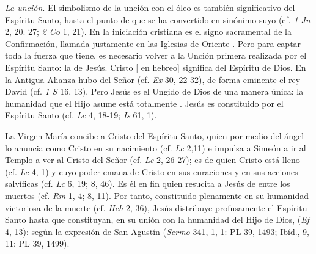 	
	 \emph{La unción}. El simbolismo de la unción con el óleo es también significativo del Espíritu Santo, hasta el punto de que se ha convertido en sinónimo suyo (cf. \emph{1 Jn} 2, 20. 27; \emph{2 Co} 1, 21). En la iniciación cristiana es el signo sacramental de la Confirmación, llamada justamente en las Iglesias de Oriente . Pero para captar toda la fuerza que tiene, es necesario volver a la Unción primera realizada por el Espíritu Santo: la de Jesús. Cristo {[} en hebreo{]} significa  del Espíritu de Dios. En la Antigua Alianza hubo  del Señor (cf. \emph{Ex} 30, 22-32), de forma eminente el rey David (cf. \emph{1 S} 16, 13). Pero Jesús es el Ungido de Dios de una manera única: la humanidad que el Hijo asume está totalmente . Jesús es constituido  por el Espíritu Santo (cf. \emph{Lc} 4, 18-19; \emph{Is} 61, 1).
	
	La Virgen María concibe a Cristo del Espíritu Santo, quien por medio del ángel lo anuncia como Cristo en su nacimiento (cf. \emph{Lc} 2,11) e impulsa a Simeón a ir al Templo a ver al Cristo del Señor (cf. \emph{Lc} 2, 26-27); es de quien Cristo está lleno (cf. \emph{Lc} 4, 1) y cuyo poder emana de Cristo en sus curaciones y en sus acciones salvíficas (cf. \emph{Lc} 6, 19; 8, 46). Es él en fin quien resucita a Jesús de entre los muertos (cf. \emph{Rm} 1, 4; 8, 11). Por tanto, constituido plenamente  en su humanidad victoriosa de la muerte (cf. \emph{Hch} 2, 36), Jesús distribuye profusamente el Espíritu Santo hasta que  constituyan, en su unión con la humanidad del Hijo de Dios,  (\emph{Ef} 4, 13):  según la expresión de San Agustín (\emph{Sermo} 341, 1, 1: PL 39, 1493; Ibíd., 9, 11: PL 39, 1499).
